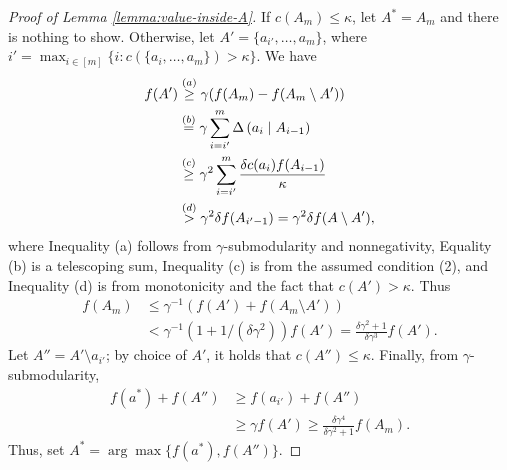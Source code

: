 \begin{proof}[Proof of Lemma \ref{lemma:value-inside-A}]
  If $c(A_m) \le \kappa$, let $A^* = A_m$ and there is nothing to show.
  Otherwise, let $A' =  \{a_{i'}, \ldots, a_m \}$, where $i' = \max_{i \in [m]} \{ i: c( \{ a_i, \ldots, a_m \} ) > \kappa \}$.
  We have
  \begin{align*}
    f(A') &\overset{(a)}{\ge} \gamma ( f(A_m) - f( A_m \setminus A') ) \\
          &\overset{(b)}{=} \gamma \sum_{i=i'}^m \Delta \left(  a_i  \mid  A_{i-1}  \right) \\
          &\overset{(c)}{\ge} \gamma^2 \sum_{i=i'}^m \frac{ \delta c(a_i) f( A_{i-1} )}{\kappa} \\
          &\overset{(d)}{>} \gamma^2 \delta f(A_{i'-1} ) = \gamma^2 \delta f( A \setminus A' ),
  \end{align*}
  where Inequality (a) follows from $\gamma$-submodularity and nonnegativity, Equality (b)
  is a telescoping sum, Inequality (c) is from the assumed condition (2), and Inequality
  (d) is from monotonicity and the fact that $c( A' ) > \kappa$.
  Thus
  \begin{align*}
    f(A_m) &\le \gamma^{-1} (f(A') + f( A_m \setminus A')) \\
           &< \gamma^{-1}(1 + 1/(\delta \gamma^2 )) f(A') = \frac{\delta \gamma^2  +1}{\delta \gamma^3 } f(A').
  \end{align*}
  Let $A'' = A' \setminus a_{i'}$; by choice of $A'$, it holds that $c(A'') \le \kappa$.
  Finally, from $\gamma$-submodularity,
  \begin{align*}
    f(a^*) + f(A'') &\ge f(a_{i'}) + f(A'') \\
                    &\ge \gamma f(A') \ge \frac{\delta \gamma^4}{\delta \gamma^2 + 1} f(A_m).
  \end{align*}
  Thus, set $A^* = \arg\max \{ f( a^* ), f(A'') \}$.
\end{proof}

